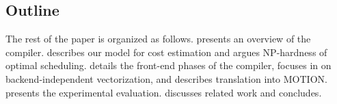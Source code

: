 \subsection{Outline}

The rest of the paper is organized as follows.  presents an overview of the compiler.  describes our model for cost estimation and argues NP-hardness of optimal scheduling.  details the front-end phases of the compiler,  focuses in on backend-independent vectorization, and  describes translation into MOTION.  presents the experimental evaluation. discusses related work and  concludes.

